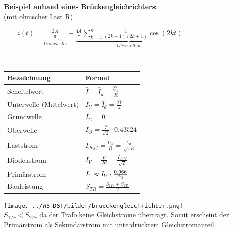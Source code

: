 	\begin{minipage}[c]{8cm} 
	   \textbf{Beispiel anhand eines Brückengleichrichters:}	  	\\
	   (mit ohmscher Last R)
	\end{minipage}   
	\begin{minipage}[c]{10cm} 	
	   $ \qquad i(t) = \underbrace{\frac{2A}{\pi}}_{Unterwelle} - \underbrace{\frac{4A}{\pi} \sum\limits_{k=1}^n \frac{1}{(2k-1)(2k+1)} \cos(2kt)}_{Oberwellen} $
	\end{minipage}\\
\begin{minipage}[c]{10cm}  
		\begin{tabular}{| l | l |}
    		\hline 
      		\textbf{Bezeichnung}
      		& \textbf{Formel} \\
      		\hline
      		Scheitelwert 
      		& $\hat{I} = \hat{I}_d = \frac{\hat{U}_d}{R} $ \\
      		Unterwelle (Mittelwert)
      		& $I_U = \bar{I}_d = \frac{2 \hat{I}}{\pi}$ \\
      		Grundwelle
      		& $I_G = 0$ \\
      		Oberwelle
      		& $I_O = \frac{\hat{I}}{\sqrt{2}} \cdot 0.43524$ \\
      		Laststrom
      		& $I_{d eff} =  \frac{U_s}{R}= \frac{\hat{U}_d}{\sqrt{2}R}$ \\ 
      		Diodenstrom
      		& $I_{V} = \frac{\hat{U}}{2 R} = \frac{I_{d eff}}{\sqrt{2}}$ \\
      		Primärstrom
      		& $I_1 \approx I_U \cdot \frac{0.966}{"u}$ \\
      		Bauleistung 
      		& $S_{TR} = \frac{S_{1Tr} + S_{2Tr}}{2}$ \\
      		\hline
    	\end{tabular}
	\end{minipage}   
	\begin{minipage}[c]{8cm}  
			\texttt{[image: ../WS\_DST/bilder/brueckengleichrichter.png]}  \\			
	$S_{1Tr} < S_{2Tr}$ da der Trafo keine Gleichströme überträgt. Somit erscheint der Primärstrom
	als Sekundärstrom mit unterdrücktem Gleichstromanteil.			
	\end{minipage}


